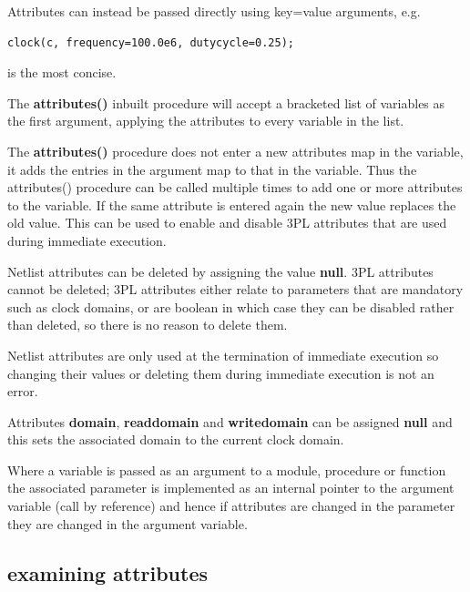             Attributes can instead be passed directly using key=value arguments,
            e.g.
            \begin{lstlisting}[gobble=12, language=threepl]
               clock(c, frequency=100.0e6, dutycycle=0.25);
            \end{lstlisting}
            is the most concise.
            
            The {\bf attributes()} inbuilt procedure will accept a bracketed
            list of variables as the first argument, applying the attributes
            to every variable in the list.
            
            The {\bf attributes()} procedure does not enter a new attributes map in
            the variable, it adds the entries in the argument map to that in the
            variable. Thus the attributes() procedure can be called multiple times
            to add one or more attributes to the variable. If the same attribute is
            entered again the new value replaces the old value. This can be used to
            enable and disable 3PL attributes that are used during immediate
            execution.
            
            Netlist attributes can be deleted by assigning the value {\bf null}.
            3PL attributes cannot be deleted; 3PL attributes either
            relate to parameters that are mandatory such as clock domains, or are
            boolean in which case they can be disabled rather than deleted, so
            there is no reason to delete them.

            Netlist attributes are only used at the termination of immediate
            execution so changing their values or deleting them during immediate
            execution is not an error.
            
            Attributes {\bf domain}, {\bf readdomain} and {\bf writedomain}
            can be assigned {\bf null} and this sets the associated
            domain to the current clock domain.
            
            Where a variable is passed as an argument to a module, procedure
            or function the associated parameter is implemented as an
            internal pointer to the argument variable (call by reference)
            and hence if attributes are changed in the parameter they are
            changed in the argument variable.
            
            

        \subsection{examining attributes}
            
